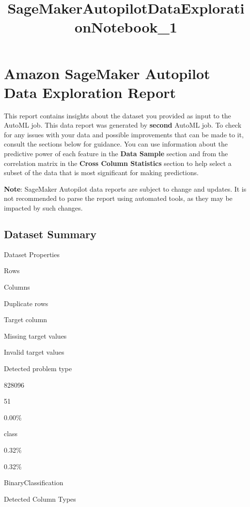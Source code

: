 \documentclass[11pt]{article}
\title{SageMakerAutopilotDataExplorationNotebook\_1}
\begin{document}
    
    \maketitle
    
    

    
    \hypertarget{amazon-sagemaker-autopilot-data-exploration-report}{%
\section{Amazon SageMaker Autopilot Data Exploration
Report}\label{amazon-sagemaker-autopilot-data-exploration-report}}

This report contains insights about the dataset you provided as input to
the AutoML job. This data report was generated by \textbf{second} AutoML
job. To check for any issues with your data and possible improvements
that can be made to it, consult the sections below for guidance. You can
use information about the predictive power of each feature in the
\textbf{Data Sample} section and from the correlation matrix in the
\textbf{Cross Column Statistics} section to help select a subset of the
data that is most significant for making predictions.

\textbf{Note}: SageMaker Autopilot data reports are subject to change
and updates. It is not recommended to parse the report using automated
tools, as they may be impacted by such changes.

\hypertarget{dataset-summary}{%
\subsection{Dataset Summary}\label{dataset-summary}}

Dataset Properties

Rows

Columns

Duplicate rows

Target column

Missing target values

Invalid target values

Detected problem type

828096

51

0.00\%

class

0.32\%

0.32\%

BinaryClassification

Detected Column Types
\end{document}
